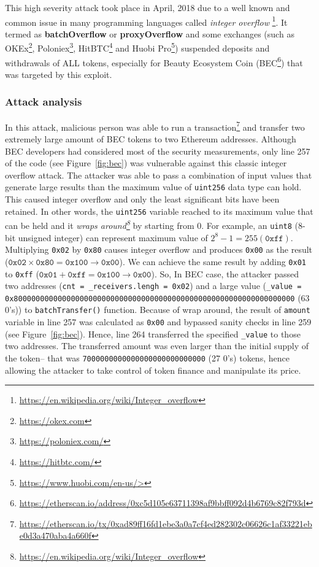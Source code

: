 
This high severity attack took place in April, 2018 due to a well known and common issue in many programming languages called \textit{integer overflow} \footnote{\url{https://en.wikipedia.org/wiki/Integer\_overflow}}. It termed as \textbf{batchOverflow} or \textbf{proxyOverflow} and some exchanges (such as OKEx\footnote{\url{https://okex.com}}, Poloniex\footnote{\url{https://poloniex.com/}}, HitBTC\footnote{\url{https://hitbtc.com/}} and Huobi Pro\footnote{\url{https://www.huobi.com/en-us/>}}) suspended deposits and withdrawals of ALL tokens, especially for Beauty Ecosystem Coin (BEC\footnote{\url{https://etherscan.io/address/0xc5d105e63711398af9bbff092d4b6769c82f793d}}) that was targeted by this exploit.

\subsubsection{Attack analysis}
In this attack, malicious person was able to run a transaction\footnote{\url{https://etherscan.io/tx/0xad89ff16fd1ebe3a0a7cf4ed282302c06626c1af33221ebe0d3a470aba4a660f}} and transfer two extremely large amount of BEC tokens to two Ethereum addresses. Although BEC developers had considered most of the security measurements, only line 257 of the code (see Figure~\ref{fig:bec}) was vulnerable against this classic integer overflow attack\cite{PeckShield01}. The attacker was able to pass a combination of input values that generate large results than the maximum value of \texttt{uint256} data type can hold. This caused integer overflow and only the least significant bits have been retained. In other words, the \texttt{uint256} variable reached to its maximum value that can be held and it \textit{wraps around\footnote{\url{https://en.wikipedia.org/wiki/Integer\_overflow}}} by starting from 0. For example, an \texttt{uint8} (8-bit unsigned integer) can represent maximum value of $2^8-1=255 (\mathtt{0xff})$. Multiplying \texttt{0x02} by \texttt{0x80} causes integer overflow and produces \texttt{0x00} as the result ($\mathtt{0x02} \times \mathtt{0x80} = \mathtt{0x100} \rightarrow \mathtt{0x00}$). We can achieve the same result by adding \texttt{0x01} to \texttt{0xff} ($\mathtt{0x01} + \mathtt{0xff} = \mathtt{0x100} \rightarrow \mathtt{0x00}$). So, In BEC case, the attacker passed two addresses (\texttt{cnt = \_receivers.lengh = 0x02}) and a large value (\texttt{\_value = 0x8000000000000000000000000000000000000000000000000000000000000000} (63 0's)) to \texttt{batchTransfer()} function. Because of wrap around, the result of \texttt{amount} variable in line 257 was calculated as \texttt{0x00} and bypassed sanity checks in line 259 (see Figure~\ref{fig:bec}). Hence, line 264 transferred the specified \texttt{\_value} to those two addresses. The transferred amount was even larger than the initial supply of the token-- that was \texttt{7000000000000000000000000000} (27 0's) tokens, hence allowing the attacker to take control of token finance and manipulate its price.

